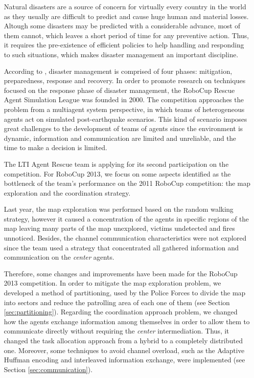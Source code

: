 Natural disasters are a source of concern for virtually every country in the world as they usually are difficult to predict and cause huge human and material losses. Altough some disasters may be predicted with a considerable advance, most of them cannot, which leaves a short period of time for any preventive action. Thus, it requires the pre-existence of efficient policies to help handling and responding to such situations, which makes disaster management an important discipline. 

According to \cite{blanchardEtAl2007}, disaster management is comprised of four phases: mitigation, preparedness, response and recovery. In order to promote research on techniques focused on the response phase of disaster management, the RoboCup Rescue Agent Simulation League \cite{kitanoEtAl1999} was founded in 2000. The competition approaches the problem from a multiagent system perspective, in which teams of heterogeneous agents act on simulated post-earthquake scenarios. This kind of scenario imposes great challenges to the development of teams of agents since the environment is dynamic, information and communication are limited and unreliable, and the time to make a decision is limited.

The LTI Agent Rescue team is applying for its second participation on the competition. For RoboCup 2013, we focus on some aspects identified as the bottleneck of the team's performance on the 2011 RoboCup competition: the map exploration and the coordination strategy.

Last year, the map exploration was performed based on the random walking strategy, however it caused a concentration of the agents in specific regions of the map leaving many parts of the map unexplored, victims undetected and fires unnoticed. Besides, the channel communication characteristics were not explored since the team used a strategy that concentrated all gathered information and communication on the {\it center} agents.

Therefore, some changes and improvements have been made for the RoboCup 2013 competition. In order to mitigate the map exploration problem, we developed a method of partitioning, used by the Police Forces to divide the map into sectors and reduce the patrolling area of each one of them (see Section \ref{sec:partitioning}). Regarding the coordination approach problem, we changed how the agents exchange information among themselves in order to allow them to communicate directly without requiring the {\it center} intermediation. Thus, it changed the task allocation approach from a hybrid to a completely distributed one. Moreover, some techniques to avoid channel overload, such as the Adaptive Huffman encoding \cite{huffman1952,vitter1987} and interleaved information exchange, were implemented (see Section \ref{sec:communication}).

